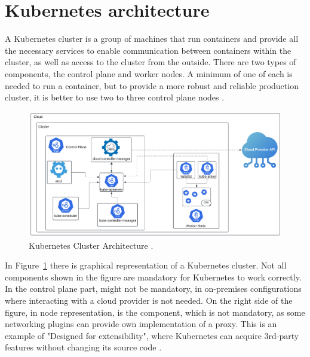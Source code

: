 
\section{Kubernetes architecture}
\label{sec:k8s_arch}
A Kubernetes cluster is a group of machines that run containers and provide all the necessary services to enable communication between containers within the cluster, as well as access to the cluster from the outside. There are two types of components, the control plane and worker nodes. A minimum of one of each is needed to run a container, but to provide a more robust and reliable production cluster, it is better to use two to three control plane nodes  \cite{KubernetesDocs}. 

\begin{figure}[tbh]
    \centering
    \includegraphics[width=1\columnwidth]{images/kubernetes-cluster-architecture.png}
    \caption{Kubernetes Cluster Architecture \cite{KubernetesDocs}.}
    \label{fig:k8s_arch}
\end{figure}

In Figure~\ref{fig:k8s_arch} there is graphical representation of a Kubernetes cluster. Not all components shown in the figure are mandatory for Kubernetes to work correctly. In the control plane part, \textit{} might not be mandatory, in on-premises configurations where interacting with a cloud provider is not needed. On the right side of the figure, in node representation, is the \textit{} component, which is not mandatory, as some networking plugins can provide own implementation of a proxy. This is an example of "Designed for extensibility", where Kubernetes can acquire 3rd-party features without changing its source code \cite{KubernetesDocs}.


